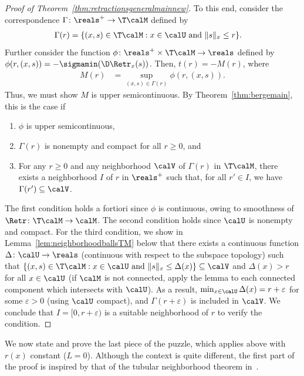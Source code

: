 \begin{proof}[Proof of Theorem~\ref{thm:retractionsgeneralmainnew}]
	To this end, consider the correspondence $\Gamma \colon \reals^+ \to \T\calM$ defined by
	\begin{align}
	\Gamma(r) & = \{ (x, s) \in \T\calM : x \in \calU \textrm{ and } \|s\|_x \leq r \}.
	\end{align}
	Further consider the function $\phi \colon \reals^+ \times \T\calM \to \reals$ defined by $\phi(r, (x, s)) = -\sigmamin(\D\Retr_x(s))$. Then, $t(r) = -M(r)$, where
	\begin{align}
	M(r) & = \sup_{(x, s) \in \Gamma(r)} \phi(r, (x, s)).
	\label{eq:Mrsup}
	\end{align}
	Thus, we must show $M$ is upper semicontinuous. By Theorem~\ref{thm:bergemain}, this is the case if
	\begin{enumerate}
		\item $\phi$ is upper semicontinuous,
		\item $\Gamma(r)$ is nonempty and compact for all $r \geq 0$, and
		\item For any $r \geq 0$ and any neighborhood $\calV$ of $\Gamma(r)$ in $\T\calM$, there exists a neighborhood $I$ of $r$ in $\reals^+$ such that, for all $r' \in I$, we have $\Gamma(r') \subseteq \calV$.
	\end{enumerate}
	The first condition holds a fortiori since $\phi$ is continuous, owing to smoothness of $\Retr \colon \T\calM \to \calM$. The second condition holds since $\calU$ is nonempty and compact.
	For the third condition, we show in Lemma~\ref{lem:neighborhoodballsTM} below that there exists a continuous function $\Delta \colon \calU \to \reals$ (continuous with respect to the subspace topology) such that $\{ (x, s) \in \T\calM : x \in \calU \textrm{ and } \|s\|_x \leq \Delta(x) \} \subseteq \calV$ and $\Delta(x) > r$ for all $x \in \calU$ (if $\calM$ is not connected, apply the lemma to each connected component which intersects with $\calU$). As a result, $\min_{x\in\calU} \Delta(x) = r + \varepsilon$ for some $\varepsilon > 0$ (using $\calU$ compact), and $\Gamma(r+\varepsilon)$ is included in $\calV$. We conclude that $I = [0, r+\varepsilon)$ is a suitable neighborhood of $r$ to verify the condition.
\end{proof}

We now state and prove the last piece of the puzzle, which applies above with $r(x)$ constant ($L = 0$). Although the context is quite different, the first part of the proof is inspired by that of the tubular neighborhood theorem in~\citep[Thm.~5.25]{lee2018riemannian}.

